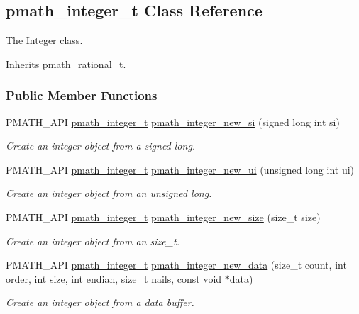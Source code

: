 \hypertarget{classpmath__integer__t}{
\subsection{pmath\_\-integer\_\-t Class Reference}
\label{classpmath__integer__t}
}
The Integer class.  


Inherits \hyperlink{classpmath__rational__t}{pmath\_\-rational\_\-t}.

\subsubsection*{Public Member Functions}
\begin{CompactItemize}
\item 
PMATH\_\-API \hyperlink{classpmath__integer__t}{pmath\_\-integer\_\-t} \hyperlink{group__numbers_g34c4815ce444a7dd88a19335098c8c5b}{pmath\_\-integer\_\-new\_\-si} (signed long int si)
\begin{CompactList}\small\item\em Create an integer object from a signed long. \item\end{CompactList}\item 
PMATH\_\-API \hyperlink{classpmath__integer__t}{pmath\_\-integer\_\-t} \hyperlink{group__numbers_ga7704c11e6f72b8403db246f6862d4c6}{pmath\_\-integer\_\-new\_\-ui} (unsigned long int ui)
\begin{CompactList}\small\item\em Create an integer object from an unsigned long. \item\end{CompactList}\item 
PMATH\_\-API \hyperlink{classpmath__integer__t}{pmath\_\-integer\_\-t} \hyperlink{group__numbers_g5fecb78f68ce62c05b1970cf1cf17dc6}{pmath\_\-integer\_\-new\_\-size} (size\_\-t size)
\begin{CompactList}\small\item\em Create an integer object from an size\_\-t. \item\end{CompactList}\item 
PMATH\_\-API \hyperlink{classpmath__integer__t}{pmath\_\-integer\_\-t} \hyperlink{group__numbers_g7ffd98a7d3634c79d261b67f76b1d011}{pmath\_\-integer\_\-new\_\-data} (size\_\-t count, int order, int size, int endian, size\_\-t nails, const void $\ast$data)
\begin{CompactList}\small\item\em Create an integer object from a data buffer. \item\end{CompactList}\item 

\end{CompactItemize}
